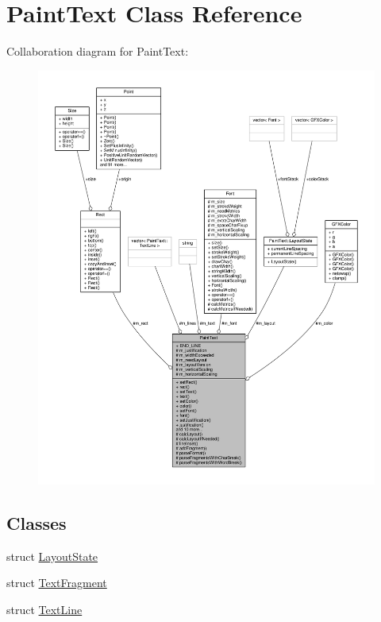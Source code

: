 \hypertarget{classPaintText}{}\section{Paint\+Text Class Reference}
\label{classPaintText}


Collaboration diagram for Paint\+Text\+:
\nopagebreak
\begin{figure}[H]
\begin{center}
\leavevmode
\includegraphics[width=350pt]{d0/d5a/classPaintText__coll__graph}
\end{center}
\end{figure}
\subsection*{Classes}
\begin{DoxyCompactItemize}
\item 
struct \hyperlink{structPaintText_1_1LayoutState}{Layout\+State}
\item 
struct \hyperlink{structPaintText_1_1TextFragment}{Text\+Fragment}
\item 
struct \hyperlink{structPaintText_1_1TextLine}{Text\+Line}
\end{DoxyCompactItemize}
